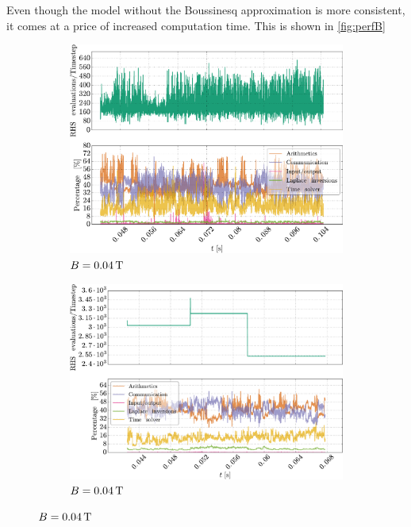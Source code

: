 %
Even though the model without the Boussinesq approximation is more consistent, it comes at a price of increased computation time.
This is shown in \cref{fig:perfB}
%
\begin{figure}[htbp]
    \centering
    \begin{subfigure}[h]{0.45\textwidth}
        \centering
        \includegraphics[width=1.0\textwidth]{fig/results/compareBouss/performance004B}
        \caption{$B=0.04\, \text{T}$}
        \label{fig:perf004B}
    \end{subfigure}%
    \hfill
    \begin{subfigure}[h]{0.45\textwidth}
        \centering
        \includegraphics[width=1.0\textwidth]{fig/results/performance/performance004}
        \caption{$B=0.04\, \text{T}$}

\end{subfigure}
\end{figure}
